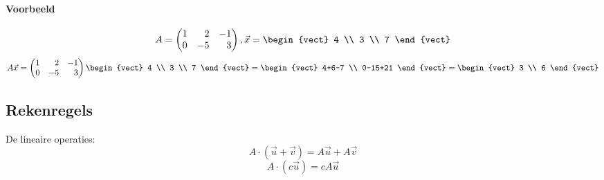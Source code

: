 \paragraph{Voorbeeld}
\[A = \begin{pmatrix*}[r] 1 & 2 & -1 \\
0 & -5 & 3 \end{pmatrix*}, \vec{x} = \begin{vect} 4 \\ 3 \\ 7 \end{vect} \]
\[ A \vec{x} = \begin{pmatrix*}[r] 1 & 2 & -1 \\
0 & -5 & 3 \end{pmatrix*}\begin{vect} 4 \\ 3 \\ 7 \end{vect} = \begin{vect} 4+6-7 \\ 0-15+21 \end{vect} = \begin{vect} 3 \\ 6 \end{vect} \]

\subsection{Rekenregels}
De lineaire operaties:
\[ A \cdot ( \vec{u} + \vec{v}) = A \vec{u} + A \vec{v} \]
\[ A \cdot (c \vec{u}) = cA\vec{u} \]

